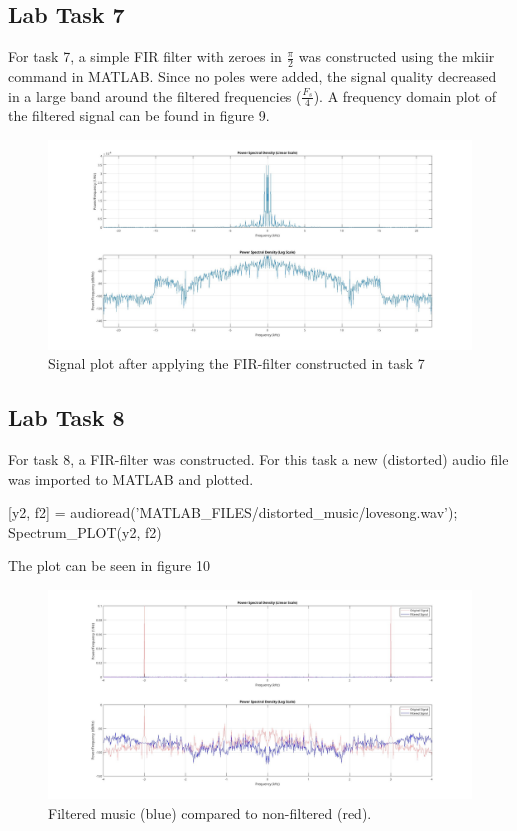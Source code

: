 \documentclass[a4paper,11pt]{article}
\begin{document}
\subsection{Lab Task 7}
For task 7, a simple FIR filter with zeroes in \pm$\frac{\pi}{2}$ was constructed using the mkiir command in MATLAB. Since no poles were added, the signal quality decreased in a large band around the filtered frequencies ($\frac{F_s}{4}$). A frequency domain plot of the filtered signal can be found in figure 9.
\begin{figure}[H]
    \includegraphics[scale=0.28]{./images/Task7-filtered.jpg}
    \caption{Signal plot after applying the FIR-filter constructed in task 7}
    \label{fig:my_label}
\end{figure}
\subsection{Lab Task 8}
For task 8, a FIR-filter was constructed. For this task a new (distorted) audio file was imported to MATLAB and plotted.
\begin{ffcode}
[y2, f2] = audioread('MATLAB_FILES/distorted_music/lovesong.wav');
Spectrum_PLOT(y2, f2)
\end{ffcode}
The plot can be seen in figure 10
\begin{figure}[H]
    \hspace{-40pt}\includegraphics[scale=0.28]{./images/Task8-double-plot.jpg}
    \caption{Filtered music (blue) compared to non-filtered (red).}
    \label{fig:my_label}
\end{figure}
\end{document}
